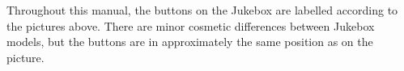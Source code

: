 \begin{figure}[h!]
\begin{center}
\end{center}
\caption{\playerman \vspace{1cm} \playertype}
\end{figure}

Throughout this manual, the buttons on the Jukebox are labelled
according to the pictures above.  There are minor cosmetic differences
between Jukebox models, but the buttons are in approximately the same
position as on the picture.\\

